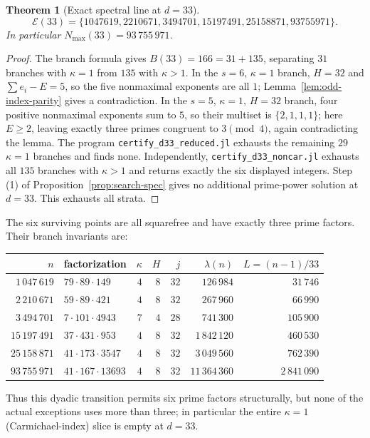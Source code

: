 \documentclass[11pt]{article}
\newtheorem{theorem}{Theorem}[section]
\begin{document}
\begin{theorem}[Exact spectral line at $d=33$]
\label{thm:d33}
\[
\mathcal E(33)=\{1047619,2210671,3494701,15197491,25158871,93755971\}.
\]
In particular $N_{\max}(33)=93\,755\,971$.
\end{theorem}

\begin{proof}
The branch formula gives $B(33)=166=31+135$, separating $31$ branches with
$\kappa=1$ from $135$ with $\kappa>1$.  In the $s=6$, $\kappa=1$ branch,
$H=32$ and $\sum e_i-E=5$, so the five nonmaximal exponents are all $1$;
Lemma~\ref{lem:odd-index-parity} gives a contradiction.  In the $s=5$,
$\kappa=1$, $H=32$ branch, four positive nonmaximal exponents sum to $5$,
so their multiset is $\{2,1,1,1\}$; here $E\ge2$, leaving exactly three
primes congruent to $3\pmod4$, again contradicting the lemma.  The program
\texttt{certify\_d33\_reduced.jl} exhausts the remaining $29$ $\kappa=1$
branches and finds none.  Independently,
\texttt{certify\_d33\_noncar.jl} exhausts all $135$ branches with
$\kappa>1$ and returns exactly the six displayed integers.  Step (1) of
Proposition~\ref{prop:search-spec} gives no additional prime-power solution
at $d=33$.  This exhausts all strata.
\end{proof}

The six surviving points are all squarefree and have exactly three prime
factors.  Their branch invariants are:
\begin{center}
\small
\begin{tabular}{r l r r r r r}
\toprule
$n$ & factorization & $\kappa$ & $H$ & $j$ & $\lambda(n)$ & $L=(n-1)/33$\\
\midrule
$1\,047\,619$  & $79\cdot89\cdot149$    & $4$ & $8$ & $32$ & $126\,984$    & $31\,746$\\
$2\,210\,671$  & $59\cdot89\cdot421$    & $4$ & $8$ & $32$ & $267\,960$    & $66\,990$\\
$3\,494\,701$  & $7\cdot101\cdot4943$   & $7$ & $4$ & $28$ & $741\,300$    & $105\,900$\\
$15\,197\,491$ & $37\cdot431\cdot953$  & $4$ & $8$ & $32$ & $1\,842\,120$ & $460\,530$\\
$25\,158\,871$ & $41\cdot173\cdot3547$ & $4$ & $8$ & $32$ & $3\,049\,560$ & $762\,390$\\
$93\,755\,971$ & $41\cdot167\cdot13693$& $4$ & $8$ & $32$ & $11\,364\,360$& $2\,841\,090$\\
\bottomrule
\end{tabular}
\end{center}
Thus this dyadic transition permits six prime factors structurally, but
none of the actual exceptions uses more than three; in particular the entire
$\kappa=1$ (Carmichael-index) slice is empty at $d=33$.
\end{document}
